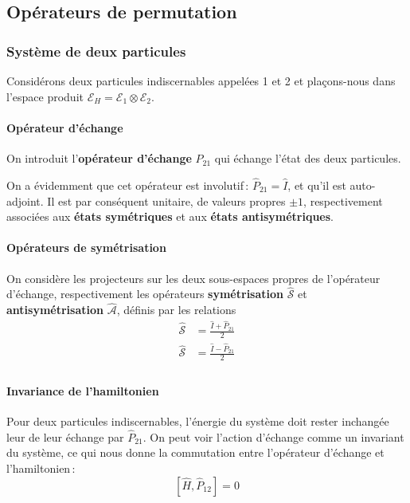     \subsection{Opérateurs de permutation}

        \subsubsection{Système de deux particules}

        Considérons deux particules indiscernables appelées 1 et 2 et plaçons-nous dans l’espace produit $\mathcal{E}_H = \mathcal{E}_1 \otimes \mathcal{E}_2$.

            \paragraph{Opérateur d’échange}

            On introduit l’\textbf{opérateur d’échange} $\hat{P}_{21}$ qui échange l’état des deux particules. 

            On a évidemment que cet opérateur est involutif : $\hat{P}_{21} = \hat{I}$, et qu’il est auto-adjoint. Il est par conséquent unitaire, de valeurs propres $\pm 1$, respectivement associées aux \textbf{états symétriques} et aux \textbf{états antisymétriques}.

            \paragraph{Opérateurs de symétrisation}

            On considère les projecteurs sur les deux sous-espaces propres de l’opérateur d’échange, respectivement les opérateurs \textbf{symétrisation} $\hat{\mathcal{S}}$ et \textbf{antisymétrisation} $\hat{\mathcal{A}}$, définis par les relations
        \begin{align*}
            \hat{\mathcal{S}} &= \frac{\hat{I} + \hat{P}_{21}}{2} \\
            \hat{\mathcal{S}} &= \frac{\hat{I} - \hat{P}_{21}}{2} \\
        \end{align*}

            \paragraph{Invariance de l’hamiltonien}

            Pour deux particules indiscernables, l’énergie du système doit rester inchangée leur de leur échange par $\hat{P}_{21}$. On peut voir l’action d’échange comme un invariant du système, ce qui nous donne la commutation entre l’opérateur d’échange et l’hamiltonien :
            \[ \left[\hat{H}, \hat{P}_{12}\right] = 0 \]  

